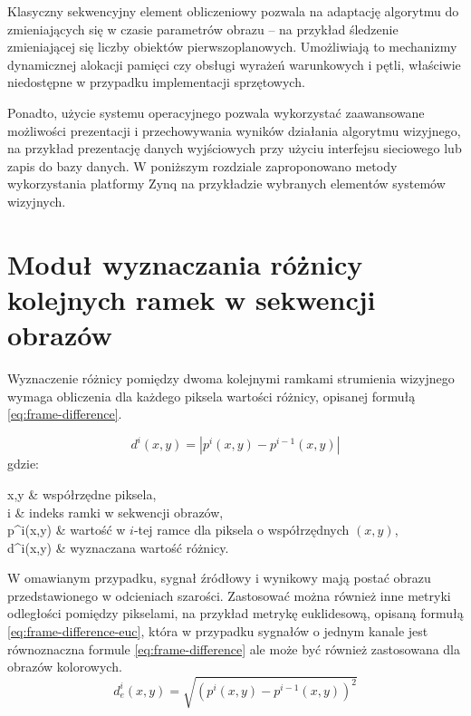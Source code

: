 Klasyczny sekwencyjny element obliczeniowy pozwala na adaptację algorytmu do zmieniających się w czasie parametrów obrazu -- na przykład śledzenie zmieniającej się liczby obiektów pierwszoplanowych. Umożliwiają to mechanizmy dynamicznej alokacji pamięci czy obsługi wyrażeń warunkowych i pętli, właściwie niedostępne w przypadku implementacji sprzętowych.%

Ponadto, użycie systemu operacyjnego pozwala wykorzystać zaawansowane możliwości prezentacji i przechowywania wyników działania algorytmu wizyjnego, na przykład prezentację danych wyjściowych przy użyciu interfejsu sieciowego lub zapis do bazy danych. %
W poniższym rozdziale zaproponowano metody wykorzystania platformy Zynq na przykładzie wybranych elementów systemów wizyjnych.


\section{Moduł wyznaczania różnicy kolejnych ramek w sekwencji obrazów} %

Wyznaczenie różnicy pomiędzy dwoma kolejnymi ramkami strumienia wizyjnego wymaga obliczenia dla każdego piksela wartości różnicy, opisanej formułą \eqref{eq:frame-difference}. %

\begin{equation}
\label{eq:frame-difference}
d^i(x,y) = | p^i(x,y) - p^{i-1}(x,y) |
\end{equation}
gdzie:
\begin{conditions}
	x,y & współrzędne piksela, \\
	i & indeks ramki w sekwencji obrazów, \\
	p^i(x,y) & wartość w $i$-tej ramce dla piksela o współrzędnych $(x,y)$, \\
	d^i(x,y) & wyznaczana wartość różnicy. \\
\end{conditions}

W omawianym przypadku, sygnał źródłowy i wynikowy mają postać obrazu przedstawionego w odcieniach szarości. %
Zastosować można również inne metryki odległości pomiędzy pikselami, na przykład metrykę euklidesową, opisaną formułą \eqref{eq:frame-difference-euc}, która w przypadku sygnałów o jednym kanale jest równoznaczna formule \eqref{eq:frame-difference} ale może być również zastosowana dla obrazów kolorowych.
\begin{equation}
\label{eq:frame-difference-euc}
d_e^i(x,y) = \sqrt{(p^i(x,y) - p^{i-1}(x,y))^2}
\end{equation}

